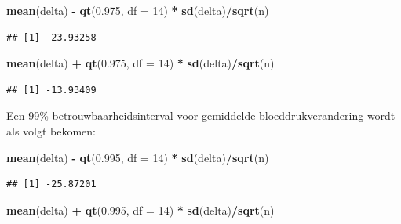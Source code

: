 \documentclass[
  12pt,dutch]{book}
\newenvironment{Shaded}{\begin{snugshade}}{\end{snugshade}}
\newcommand{\AttributeTok}[1]{\textcolor[rgb]{0.13,0.29,0.53}{#1}}
\newcommand{\DecValTok}[1]{\textcolor[rgb]{0.00,0.00,0.81}{#1}}
\newcommand{\FloatTok}[1]{\textcolor[rgb]{0.00,0.00,0.81}{#1}}
\newcommand{\FunctionTok}[1]{\textcolor[rgb]{0.13,0.29,0.53}{\textbf{#1}}}
\newcommand{\NormalTok}[1]{#1}
\newcommand{\SpecialCharTok}[1]{\textcolor[rgb]{0.81,0.36,0.00}{\textbf{#1}}}
\theoremstyle{definition}
\theoremstyle{definition}
\theoremstyle{definition}
\theoremstyle{definition}
\theoremstyle{remark}
\begin{document}
\begin{Shaded}
\begin{Highlighting}[]
\FunctionTok{mean}\NormalTok{(delta) }\SpecialCharTok{{-}} \FunctionTok{qt}\NormalTok{(}\FloatTok{0.975}\NormalTok{, }\AttributeTok{df =} \DecValTok{14}\NormalTok{) }\SpecialCharTok{*} \FunctionTok{sd}\NormalTok{(delta)}\SpecialCharTok{/}\FunctionTok{sqrt}\NormalTok{(n)}
\end{Highlighting}
\end{Shaded}

\begin{verbatim}
## [1] -23.93258
\end{verbatim}

\begin{Shaded}
\begin{Highlighting}[]
\FunctionTok{mean}\NormalTok{(delta) }\SpecialCharTok{+} \FunctionTok{qt}\NormalTok{(}\FloatTok{0.975}\NormalTok{, }\AttributeTok{df =} \DecValTok{14}\NormalTok{) }\SpecialCharTok{*} \FunctionTok{sd}\NormalTok{(delta)}\SpecialCharTok{/}\FunctionTok{sqrt}\NormalTok{(n)}
\end{Highlighting}
\end{Shaded}

\begin{verbatim}
## [1] -13.93409
\end{verbatim}

Een 99\% betrouwbaarheidsinterval voor gemiddelde bloeddrukverandering wordt als volgt bekomen:

\begin{Shaded}
\begin{Highlighting}[]
\FunctionTok{mean}\NormalTok{(delta) }\SpecialCharTok{{-}} \FunctionTok{qt}\NormalTok{(}\FloatTok{0.995}\NormalTok{, }\AttributeTok{df =} \DecValTok{14}\NormalTok{) }\SpecialCharTok{*} \FunctionTok{sd}\NormalTok{(delta)}\SpecialCharTok{/}\FunctionTok{sqrt}\NormalTok{(n)}
\end{Highlighting}
\end{Shaded}

\begin{verbatim}
## [1] -25.87201
\end{verbatim}

\begin{Shaded}
\begin{Highlighting}[]
\FunctionTok{mean}\NormalTok{(delta) }\SpecialCharTok{+} \FunctionTok{qt}\NormalTok{(}\FloatTok{0.995}\NormalTok{, }\AttributeTok{df =} \DecValTok{14}\NormalTok{) }\SpecialCharTok{*} \FunctionTok{sd}\NormalTok{(delta)}\SpecialCharTok{/}\FunctionTok{sqrt}\NormalTok{(n)}
\end{Highlighting}
\end{Shaded}
\end{document}
